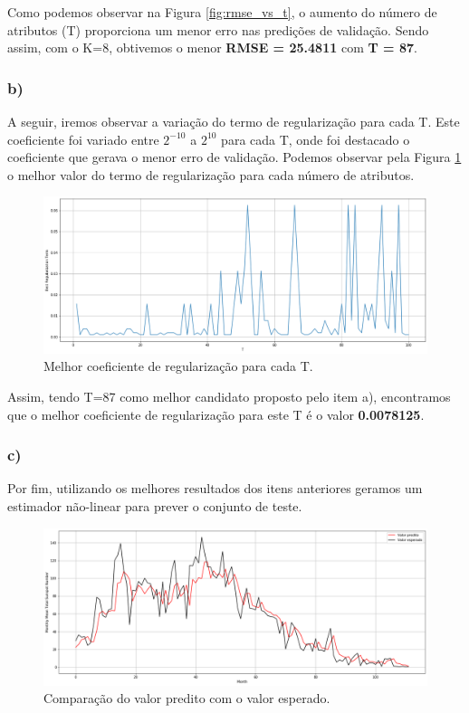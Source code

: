 \documentclass[12pt]{article}
\begin{document}
Como podemos observar na Figura \ref{fig:rmse_vs_t}, o aumento do número de atributos (T) proporciona um menor erro nas predições de validação. Sendo assim, com o K=8, obtivemos o menor \textbf{RMSE = 25.4811} com \textbf{T = 87}.


\subsubsection*{b)}

A seguir, iremos observar a variação do termo de regularização para cada T. Este coeficiente foi variado entre $2^{-10}$ a $2^{10}$ para cada T, onde foi destacado o coeficiente que gerava o menor erro de validação. Podemos observar pela Figura \ref{fig:c_vs_t} o melhor valor do termo de regularização para cada número de atributos.


\begin{figure}[h!]
	\centering
	\includegraphics[width=\linewidth]{c_vs_t.png}
	\caption{Melhor coeficiente de regularização para cada T.}
	\label{fig:c_vs_t}
\end{figure}

Assim, tendo T=87 como melhor candidato proposto pelo item a), encontramos que o melhor coeficiente de regularização para este T é o valor \textbf{0.0078125}.

\subsubsection*{c)}
Por fim, utilizando os melhores resultados dos itens anteriores geramos um estimador não-linear para prever o conjunto de teste. 

\begin{figure}[h!]
	\centering
	\includegraphics[width=\linewidth]{test_best.png}
	\caption{Comparação do valor predito com o valor esperado.}
	\label{fig:test_best}
\end{figure}
\end{document}
